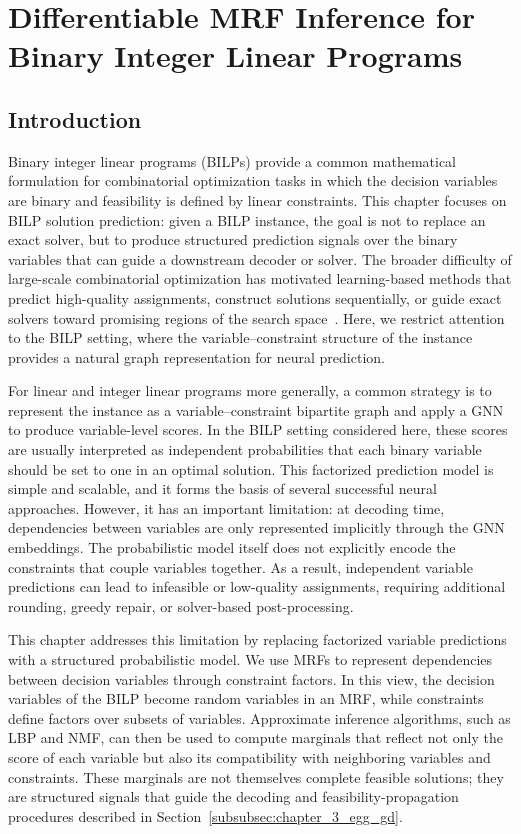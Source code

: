\chapter{Differentiable MRF Inference for Binary Integer Linear Programs}
\label{chapter:3_differentiable_mrf_inference_for_BILPs}

\section{Introduction}
\label{sec:chapter_3_introduction}

Binary integer linear programs (BILPs) provide a common mathematical formulation for combinatorial optimization tasks in which the decision variables are binary and feasibility is defined by linear constraints. This chapter focuses on BILP solution prediction: given a BILP instance, the goal is not to replace an exact solver, but to produce structured prediction signals over the binary variables that can guide a downstream decoder or solver. The broader difficulty of large-scale combinatorial optimization has motivated learning-based methods that predict high-quality assignments, construct solutions sequentially, or guide exact solvers toward promising regions of the search space~\cite{dai_learning_2017,gasse_exact_2019,nair_solving_2020,sun_difusco_2023}. Here, we restrict attention to the BILP setting, where the variable--constraint structure of the instance provides a natural graph representation for neural prediction.

For linear and integer linear programs more generally, a common strategy is to represent the instance as a variable--constraint bipartite graph and apply a GNN to produce variable-level scores. In the BILP setting considered here, these scores are usually interpreted as independent probabilities that each binary variable should be set to one in an optimal solution. This factorized prediction model is simple and scalable, and it forms the basis of several successful neural approaches. However, it has an important limitation: at decoding time, dependencies between variables are only represented implicitly through the GNN embeddings. The probabilistic model itself does not explicitly encode the constraints that couple variables together. As a result, independent variable predictions can lead to infeasible or low-quality assignments, requiring additional rounding, greedy repair, or solver-based post-processing.

This chapter addresses this limitation by replacing factorized variable predictions with a structured probabilistic model. We use MRFs to represent dependencies between decision variables through constraint factors. In this view, the decision variables of the BILP become random variables in an MRF, while constraints define factors over subsets of variables. Approximate inference algorithms, such as LBP and NMF, can then be used to compute marginals that reflect not only the score of each variable but also its compatibility with neighboring variables and constraints. These marginals are not themselves complete feasible solutions; they are structured signals that guide the decoding and feasibility-propagation procedures described in Section~\ref{subsubsec:chapter_3_egg_gd}.

